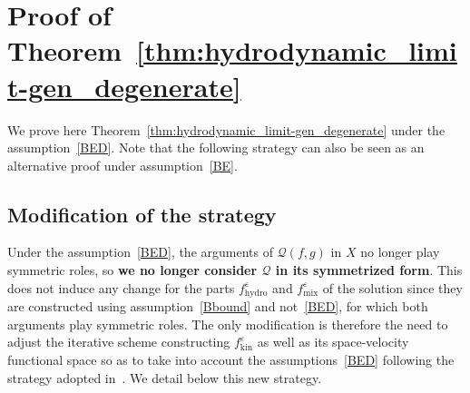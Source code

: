 \documentclass[AHL,Unicode,longabstracts,published]{cedram}
\newcommand{\hyd}{\mathrm{hydro}}
\newcommand{\mix}{\mathrm{mix}}
\newcommand{\kin}{\mathrm{kin}}
\newcommand{\QQ}{\mathcal{Q}}
\newcommand{\Sl}{X}
\newcommand*\eps{{\varepsilon}}
\begin{document}
\section{Proof of Theorem~\ref{thm:hydrodynamic_limit-gen_degenerate}}\label{scn:hydrodynamic_limit_BED}

We prove here Theorem~\ref{thm:hydrodynamic_limit-gen_degenerate} under the assumption~\eqref{BED}. Note that the following strategy can also be seen as an alternative proof under assumption~\eqref{BE}.

\subsection{Modification of the strategy} 

Under the assumption~\eqref{BED}, the arguments of $\QQ(f, g)$ in $\Sl$ no longer play symmetric roles, so \textbf{we no longer consider $\QQ$ in its symmetrized form}. This does not induce any change for the parts $f^\eps_\hyd$ and $f^\eps_\mix$ of the solution since they are constructed using assumption~\eqref{Bbound} and not~\eqref{BED}, for which both arguments play symmetric roles. The only modification is therefore the need to adjust the iterative scheme constructing $f^\eps_\kin$ as well as its space-velocity functional space so as to take into account the assumptions~\eqref{BED} following the strategy adopted in~\cite{CG2022,CM2017,CTW2016,GMM2017,HTT2020}. We detail below this new strategy.
\end{document}
